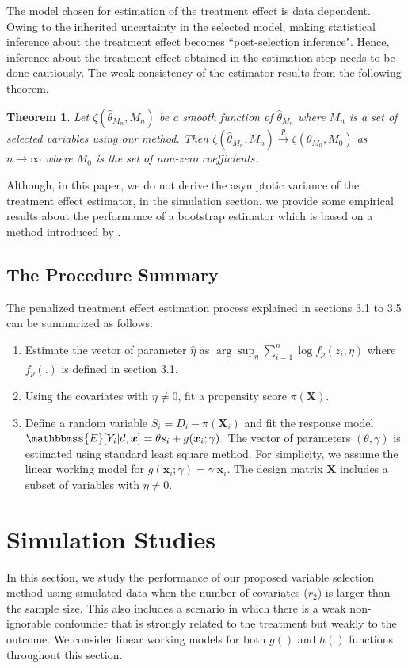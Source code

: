 \documentclass[11pt]{statsoc}
\newtheorem{theorem}{Theorem}
\begin{document}
 The model chosen for estimation of the treatment effect is data dependent. Owing to the inherited uncertainty in the selected model, making statistical inference about the treatment effect becomes ``post-selection inference". Hence, inference about the treatment effect obtained in the estimation step needs to be done cautiously. The weak consistency of the estimator results from the following theorem.
\begin{theorem}
Let $\zeta(\hat \theta_{M_n},M_n)$ be a smooth function of $\hat \theta_{M_n}$ where $M_n$ is a set of selected variables using our method. Then $\zeta(\hat\theta_{M_n},M_n) {\stackrel{p}{\longrightarrow}} \zeta(\theta_{M_0},M_0)$ as $n \rightarrow \infty$ where $M_0$ is the set of non-zero coefficients.
\label{th:consis}
\end{theorem}
Although, in this paper, we do not derive the asymptotic variance of the treatment effect estimator, in the simulation section, we provide some empirical results about the performance of a bootstrap estimator which is based on a method introduced by \cite{chatterjee2011bootstrapping}.

\subsection{The Procedure Summary}

The penalized treatment effect estimation process explained in sections 3.1 to 3.5 can be summarized as follows: \vspace{-.1in}
\begin{enumerate}
\item Estimate the vector of parameter $\hat \eta$ as $ \arg \sup_{\eta} \sum_{i=1}^n \log f_p(z_i; \eta)$ where $f_p(.)$ is defined in section 3.1.
\item Using the covariates with $\eta \neq 0$, fit a propensity score $\pi({\bm{X}})$. 
\item Define a random variable $S_i=D_i-\pi({\bm{X}}_i)$ and fit the response model ${\mathbbmss{E}}[Y_i|d,{\bm{x}}]=\theta s_i+ g({\bm{x}}_i;\gamma).$
The vector of parameters $(\theta,\gamma)$ is estimated using standard least square method. For simplicity, we assume the linear working model for $g({\bm{x}}_i;\gamma)=\gamma^{\prime}{\bm{x}}_i$. The design matrix ${\bm{X}}$ includes a subset of variables with  $\eta \neq 0$.
\end{enumerate}

\section{Simulation Studies} \label{sec:simulation}
In this section, we study the performance of our proposed variable selection method using  simulated data when the number of covariates ($r_2$) is larger than the sample size. This also includes a scenario in which there is a weak non-ignorable confounder that is strongly related to the treatment but weakly to the outcome. We consider linear working models for both $g()$ and $h()$ functions throughout this section.
\end{document}
